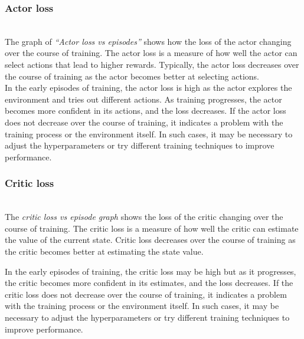 \documentclass[preprint,12pt]{elsarticle}
\begin{document}
\subsubsection{Actor loss}\\
The graph of \textit{“Actor loss vs episodes” } shows how the loss of the actor changing over the course of training. The actor loss is a measure of how well the actor can select actions that lead to higher rewards. Typically, the actor loss decreases over the course of training as the actor becomes better at selecting actions.\\
In the early episodes of training, the actor loss is high as the actor explores the environment and tries out different actions. As training progresses, the actor becomes more confident in its actions, and the loss decreases. If the actor loss does not decrease over the course of training, it indicates a problem with the training process or the environment itself. In such cases, it may be necessary to adjust the hyperparameters or try different training techniques to improve performance.\\

\subsubsection{Critic loss}\\
The \textit{critic loss vs episode graph} shows the loss of the critic changing over the course of training. The critic loss is a measure of how well the critic can estimate the value of the current state. Critic loss decreases over the course of training as the critic becomes better at estimating the state value. 

In the early episodes of training, the critic loss may be high but as it progresses, the critic becomes more confident in its estimates, and the loss decreases. If the critic loss does not decrease over the course of training, it indicates a problem with the training process or the environment itself. In such cases, it may be necessary to adjust the hyperparameters or try different training techniques to improve performance.\\
\end{document}
